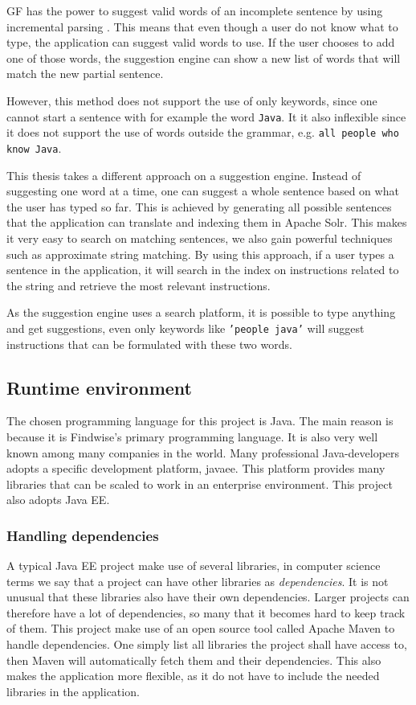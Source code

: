 GF has the power to suggest valid words of an incomplete sentence by using incremental parsing \cite{angelov09:incremental-parser}. This means that even though a user do not know what to type, the application can suggest valid words to use. If the user chooses to add one of those words, the suggestion engine can show a new list of words that will match the new partial sentence.

However, this method does not support the use of only keywords, since one cannot start a sentence with for example the word \texttt{Java}. It it also inflexible since it does not support the use of words outside the grammar, e.g. \texttt{all people who know Java}.

This thesis takes a different approach on a suggestion engine. Instead of suggesting one word at a time, one can suggest a whole sentence based on what the user has typed so far. This is achieved by generating all possible sentences that the application can translate and indexing them in Apache Solr. This makes it very easy to search on matching sentences, we also gain powerful techniques such as approximate string matching. 
\newline
\newline
By using this approach, if a user types a sentence in the application, it will search in the index on instructions related to the string and retrieve the most relevant instructions.

As the suggestion engine uses a search platform, it is possible to type anything and get suggestions, even only keywords like \texttt{'people java'} will suggest instructions that can be formulated with these two words.

\subsection{Runtime environment}
The chosen programming language for this project is Java. The main reason is because it is Findwise's primary programming language. It is also very well known among many companies in the world.
Many professional Java-developers adopts a specific development platform, \ac{javaee}. This platform provides many libraries that can be scaled to work in an enterprise environment. This project also adopts Java EE.

\subsubsection*{Handling dependencies}
A typical Java EE project make use of several libraries, in computer science terms we say that a project can have other libraries as \emph{dependencies}. It is not unusual that these libraries also have their own dependencies. Larger projects can therefore have a lot of dependencies, so many that it becomes hard to keep track of them. This project make use of an open source tool called Apache Maven to handle dependencies. One simply list all libraries the project shall have access to, then Maven will automatically fetch them and their dependencies. This also makes the application more flexible, as it do not have to include the needed libraries in the application.

